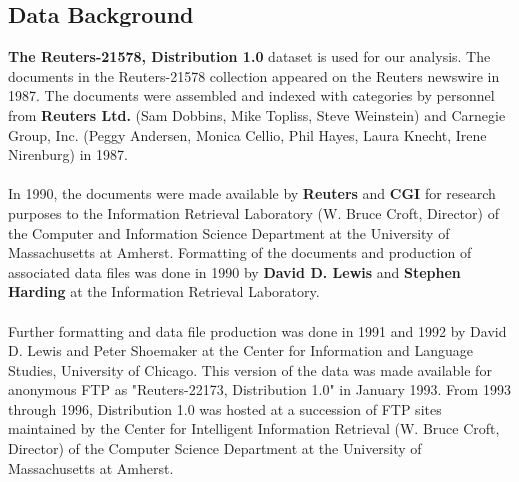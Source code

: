 \documentclass[fleqn,10pt]{SelfArx} %
\begin{document}

\subsection{Data Background}
\textbf{The Reuters-21578, Distribution 1.0} \cite{REF:5} dataset is used for our analysis. The documents in the Reuters-21578 collection appeared on the Reuters newswire in 1987. The documents were assembled and indexed with categories by personnel from \textbf{Reuters Ltd.} (Sam Dobbins, Mike Topliss, Steve Weinstein) and Carnegie Group, Inc. (Peggy Andersen, Monica Cellio, Phil Hayes, Laura Knecht, Irene Nirenburg) in 1987.
\\\\In 1990, the documents were made available by \textbf{Reuters} and \textbf{CGI} for research purposes to the Information Retrieval Laboratory (W.  Bruce Croft, Director) of the Computer and Information Science Department at the University of Massachusetts at Amherst.  Formatting of the documents and production of associated data files was done in 1990 by \textbf{David D.  Lewis} and \textbf{Stephen Harding} at the Information Retrieval Laboratory.
\\\\Further formatting and data file production was done in 1991 and 1992 by David D. Lewis and Peter Shoemaker at the Center for Information and Language Studies, University of Chicago.  This version of the data was made available for anonymous FTP as "Reuters-22173, Distribution 1.0" in January 1993. From 1993 through 1996, Distribution 1.0 was hosted at a succession of FTP sites maintained by the Center for Intelligent Information Retrieval (W. Bruce Croft, Director) of the Computer Science Department at the University of Massachusetts at Amherst.
\end{document}
